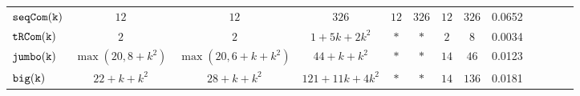 {\begin {table}[t]
\begin{center}
{\begin{tabular}{ | >{\tiny}l | c | c | c | c | c | c | c | c | c | c | c |c}
         $  \mathtt{seqCom(k)}$ &  $12$ & $12  $  & $326 $  &   $12  $  & $326 $ &$12  $  & $326 $ & 0.0652 \\
         $  \mathtt{tRCom(k)}$ &  $2$ &  $ 2$ & $ 1 + 5k + 2 k^2 $  &  $ * $   &   $* $ & $2$ & $8$ & 0.0034  \\
         $  \mathtt{{jumbo(k)}}$&  $ \max(20, 8+k^2)$  & $  \max(20, 6+k+k^2)$   &   $ {44+k+k^2} $  &  $ * $   &  $* $ & $14$ & $46$ & 0.0123 \\
         $  {\mathtt{big(k)}} $&  $22+k+k^2$  &   $28 + k + k^2$ &  $121+11k+4k^2 $  &  $ * $   &  $* $ & $14$ & $136$ & 0.0181 \\
        \hline \hline 
        \end{tabular}
}
\end{center}
\vspace{-0.8cm}
\end{table}
}


